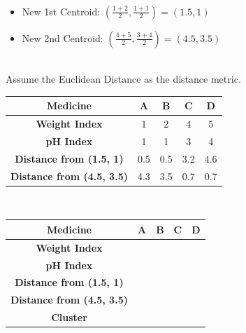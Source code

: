 \documentclass{book}
\begin{document}
\\
\begin{itemize}
    \item New 1st Centroid: \((\frac{1+2}{2}, \frac{1+1}{2}) = (1.5, 1)\)
    \item New 2nd Centroid: \((\frac{4+5}{2}, \frac{3+4}{2}) = (4.5, 3.5)\)
\end{itemize}
\\
Assume the Euclidean Distance as the distance metric.\\
\begin{center}
    \begin{tabular}{|c|c|c|c|c|}
        \hline
        \rowcolor{lightblue}
        \textbf{Medicine} & \textbf{A} & \textbf{B} & \textbf{C} & \textbf{D}\\
        \hline
        \textbf{Weight Index} & 1 & 2 & 4 & 5 \\
        \hline
        \textbf{pH Index} & 1 & 1 & 3 & 4 \\
        \hline
        \textbf{Distance from (1.5, 1)} & 0.5 & 0.5 & 3.2 & 4.6 \\
        \hline
        \textbf{Distance from (4.5, 3.5)} & 4.3 & 3.5 & 0.7 & 0.7 \\
        \hline
    \end{tabular}
\end{center}
\newpage
{}\\
\begin{center}
    \begin{tabular}{|c|c|c|c|c|}
        \hline
        \rowcolor{lightblue}
        \textbf{Medicine} & \textbf{A} & \textbf{B} & \textbf{C} & \textbf{D}\\
        \hline
        \textbf{Weight Index} & \cellcolor{lightyellow}{1} & \cellcolor{lightyellow}{2} & \cellcolor{lightred}{4} & \cellcolor{lightred}{5} \\
        \hline
        \textbf{pH Index} & \cellcolor{lightyellow}{1} & \cellcolor{lightyellow}{1} & \cellcolor{lightred}{3} & \cellcolor{lightred}{4} \\
        \hline
        \textbf{Distance from (1.5, 1)} & \cellcolor{lightyellow}{0.5} & \cellcolor{lightyellow}{0.5} & \cellcolor{lightred}{3.2} & \cellcolor{lightred}{4.6} \\
        \hline
        \textbf{Distance from (4.5, 3.5)} & \cellcolor{lightyellow}{4.3} & \cellcolor{lightyellow}{3.5} & \cellcolor{lightred}{0.7} & \cellcolor{lightred}{0.7} \\
        \hline
        \textbf{Cluster} & \cellcolor{lightyellow}{1} & \cellcolor{lightyellow}{1} & \cellcolor{lightred}{2} & \cellcolor{lightred}{2} \\
        \hline
    \end{tabular}
\end{center}
\end{document}
